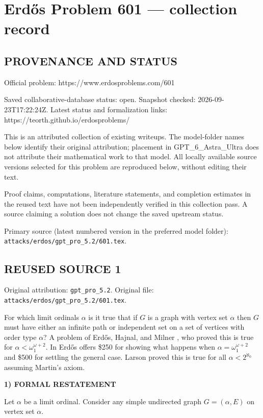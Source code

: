 \section*{Erd\H{o}s Problem 601 --- collection record}

\subsection*{PROVENANCE AND STATUS}
Official problem: https://www.erdosproblems.com/601

Saved collaborative-database status: open.
Snapshot checked: 2026-09-23T17:22:24Z.
Latest status and formalization links: https://teorth.github.io/erdosproblems/

This is an attributed collection of existing writeups. The model-folder names below identify their original attribution; placement in GPT\_6\_Astra\_Ultra does not attribute their mathematical work to that model. All locally available source versions selected for this problem are reproduced below, without editing their text.

Proof claims, computations, literature statements, and completion estimates in the reused text have not been independently verified in this collection pass. A source claiming a solution does not change the saved upstream status.

Primary source (latest numbered version in the preferred model folder): \texttt{attacks/erdos/gpt\_pro\_5.2/601.tex}.

\subsection*{REUSED SOURCE 1}
Original attribution: \texttt{gpt\_pro\_5.2}.
Original file: \texttt{attacks/erdos/gpt\_pro\_5.2/601.tex}.


For which limit ordinals $\alpha$ is it true that if $G$ is a graph with vertex set $\alpha$ then $G$ must have either an infinite path or independent set on a set of vertices with order type $\alpha$? A problem of Erd\H{o}s, Hajnal, and Milner \cite{EHM70}, who proved this is true for $\alpha < \omega_1^{\omega+2}$. In \cite{Er82e} Erd\H{o}s offers \$250 for showing what happens when $\alpha=\omega_1^{\omega+2}$ and \$500 for settling the general case. Larson \cite{La90} proved this is true for all $\alpha<2^{\aleph_0}$ assuming Martin's axiom.

\noindent\textbf{1) FORMAL RESTATEMENT}\par
Let $\alpha$ be a limit ordinal. Consider any simple undirected graph $G=(\alpha,E)$ on vertex set $\alpha$.

